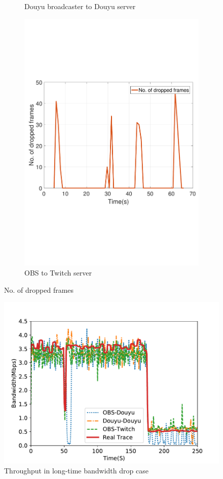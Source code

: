 \begin{figure}[htb]
\begin{subfigure}[b]{0.32\textwidth}
  \caption{Douyu broadcaster to Douyu server}
  \label{fig:douyu-drop}
\end{subfigure}
\begin{subfigure}[b]{0.32\textwidth}%
  \includegraphics[width=0.8\linewidth]{fig/obs_twitch_drop.pdf}
  \caption{OBS to Twitch server}
  \label{fig:obs-twitch-drop}
\end{subfigure}
\caption{No. of dropped frames}\label{fig:commerical-drop}
\end{figure}

\begin{figure}[htb]
\centering
\includegraphics[width=.7\columnwidth]{fig/vary-bandwidth.pdf}
\caption{Throughput in long-time bandwidth drop case}
\label{fig:vary-bandwidth}
\end{figure}

